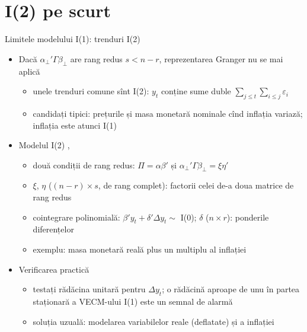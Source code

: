 \section{I(2) pe scurt}

\begin{frame}{Limitele modelului I(1): trenduri I(2)}
\itemsize{\small}
\begin{itemize}
    \item Dacă $\alpha_\perp'\Gamma\beta_\perp$ are rang redus $s < n - r$, reprezentarea Granger nu se mai aplică
    \begin{itemize}
        \item unele trenduri comune sînt I(2): $y_t$ conține sume duble $\sum_{j\le t}\sum_{i\le j}\varepsilon_i$
        \item candidați tipici: prețurile și masa monetară nominale cînd inflația variază; inflația este atunci I(1)
    \end{itemize}
    \item Modelul I(2) , 
    \begin{itemize}
        \item două condiții de rang redus: $\Pi = \alpha\beta'$ și $\alpha_\perp'\Gamma\beta_\perp = \xi\eta'$
        \item $\xi$, $\eta$ ($(n - r)\times s$, de rang complet): factorii celei de-a doua matrice de rang redus
        \item cointegrare polinomială: $\beta'y_t + \delta'\Delta y_t \sim$ I(0); $\delta$ ($n\times r$): ponderile diferențelor
        \item exemplu: masa monetară reală plus un multiplu al inflației
    \end{itemize}
    \item Verificarea practică
    \begin{itemize}
        \item testați rădăcina unitară pentru $\Delta y_t$; o rădăcină aproape de unu în partea staționară a VECM-ului I(1) este un semnal de alarmă
        \item soluția uzuală: modelarea variabilelor reale (deflatate) și a inflației
    \end{itemize}
\end{itemize}
\end{frame}

